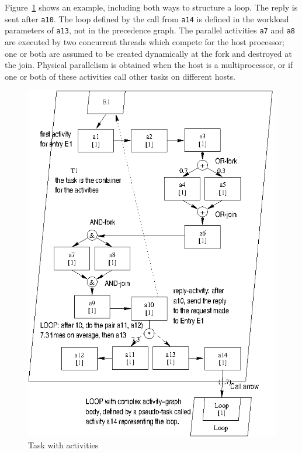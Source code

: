 \documentclass[11pt]{article}
\begin{document}
Figure~\ref{fig:activities} shows an example, including both ways to structure a loop. 
The reply is sent after \texttt{a10}. The loop defined by the call from \texttt{a14} is defined in the workload
parameters of \texttt{a13}, not in the precedence graph. The parallel activities \texttt{a7} and \texttt{a8} are executed by
two concurrent threads which compete for the host processor; one or both are assumed to be created
dynamically at the fork and destroyed at the join. Physical parallelism is obtained when the host is a
multiprocessor, or if one or both of these activities call other tasks on different hosts. 

\begin{figure}[htbp]
  \centering
  \includegraphics{model/activity-model.eps}
  \caption{Task with activities}
  \label{fig:activities}
\end{figure}
\end{document}
